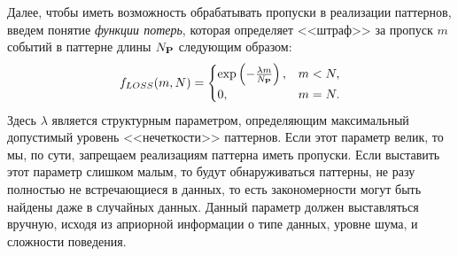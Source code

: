 \documentclass[12pt,fсeqn]{article}
\begin{document}
Далее, чтобы иметь возможность обрабатывать пропуски в реализации паттернов, 
введем понятие {\em функции потерь}, которая определяет <<штраф>> за пропуск
 $m$ событий в паттерне длины $N_{{\bf P}}$ следующим образом:
$$
f_{LOSS}(m,N)= \begin{cases}
   \exp\left(-\frac{\lambda m}{N_{{\bf P}}}\right), & m < N, \\
   0,                                    & m=N.
   \end{cases}
$$
Здесь $\lambda$ является структурным параметром, определяющим максимальный допустимый уровень
<<нечеткости>> паттернов. Если этот параметр велик, то мы, по сути, запрещаем реализациям
паттерна иметь пропуски. Если выставить этот параметр слишком малым, то будут обнаруживаться
паттерны, не разу полностью не встречающиеся в данных, то есть закономерности могут быть  найдены
даже в случайных данных. Данный параметр должен выставляться вручную, исходя из априорной информации
о типе данных, уровне шума, и сложности поведения. 
\end{document}
